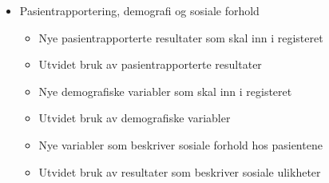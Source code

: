 \documentclass[norsk, a4paper, twocolumn]{report}
\begin{document}
\begin{itemize}
\begin{itemize}
    \end{itemize}
  \item Pasientrapportering, demografi og sosiale forhold
    \begin{itemize}
      \item Nye pasientrapporterte resultater som skal inn i registeret
      \item Utvidet bruk av pasientrapporterte resultater
      \item Nye demografiske variabler som skal inn i registeret
      \item Utvidet bruk av demografiske variabler
      \item Nye variabler som beskriver sosiale forhold hos pasientene
      \item Utvidet bruk av resultater som beskriver sosiale ulikheter
    \end{itemize}
\end{itemize}
\end{document}
